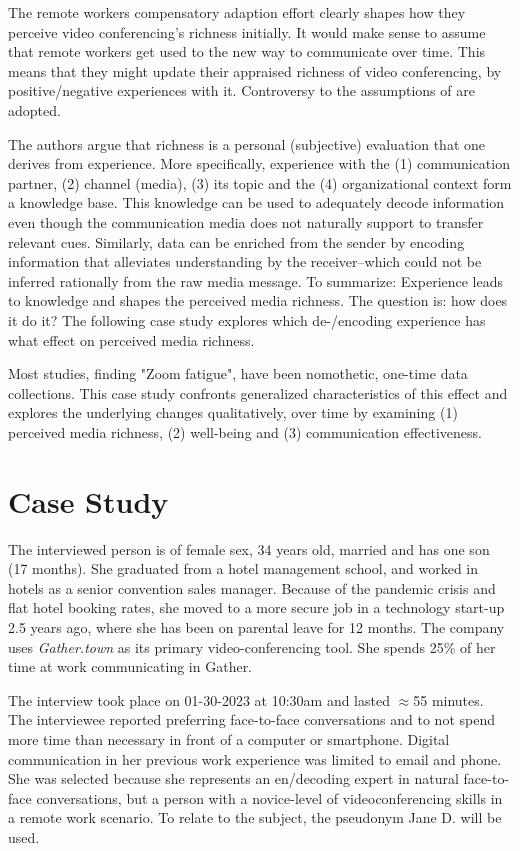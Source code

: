 \documentclass[man]{apa7}
\begin{document}
The remote workers compensatory adaption effort clearly shapes how they perceive video conferencing's richness initially. It would make sense to assume that remote workers get used to the new way to communicate over time. This means that they might update their appraised richness of video conferencing, by positive/negative experiences with it. Controversy to \citeauthor{daft1983information} the assumptions of \cite{Carlson1999} are adopted.

The authors argue that richness is a personal (subjective) evaluation that one derives from experience. More specifically, experience with the (1) communication partner, (2) channel (media), (3) its topic and the (4) organizational context form a knowledge base. This knowledge can be used to adequately decode information even though the communication media does not naturally support to transfer relevant cues. Similarly, data can be enriched from the sender by encoding information that alleviates understanding by the receiver–which could not be inferred rationally from the raw media message. To summarize: Experience leads to knowledge and shapes the perceived media richness. The question is: how does it do it? The following case study explores which de-/encoding experience has what effect on perceived media richness.

Most studies, finding "Zoom fatigue", have been nomothetic, one-time data collections. This case study confronts generalized characteristics of this effect and explores the underlying changes qualitatively, over time by examining (1) perceived media richness, (2) well-being and (3) communication effectiveness.

\section{Case Study}

The interviewed person is of female sex, 34 years old, married and has one son (17 months). She graduated from a hotel management school, and worked in hotels as a senior convention sales manager. Because of the pandemic crisis and flat hotel booking rates, she moved to a more secure job in a technology start-up 2.5 years ago, where she has been on parental leave for 12 months. The company uses \textit{Gather.town} as its primary video-conferencing tool. She spends 25\% of her time at work communicating in Gather.

The interview took place on 01-30-2023 at 10:30am and lasted $\approx$55 minutes. The interviewee reported preferring face-to-face conversations and to not spend more time than necessary in front of a computer or smartphone. Digital communication in her previous work experience was limited to email and phone. She was selected because she represents an en/decoding expert in natural face-to-face conversations, but a person with a novice-level of videoconferencing skills in a remote work scenario. To relate to the subject, the pseudonym Jane D. will be used.
\end{document}
